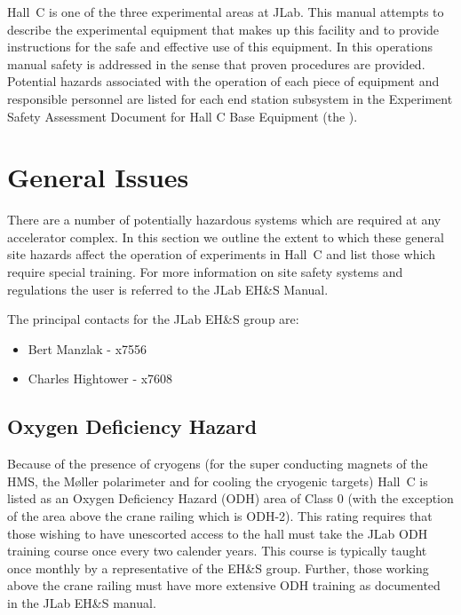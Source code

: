 %
%

Hall~C is one of the three experimental areas at JLab. This manual
attempts to describe the experimental equipment that makes up this facility
and to provide instructions for the safe and effective use of this equipment.
In this operations manual safety is addressed in the sense that proven
procedures are provided. Potential hazards associated with the operation
of each piece of equipment and responsible personnel are listed for each
end station subsystem in the Experiment Safety Assessment Document
for Hall C Base Equipment 
(the ).  

\section{General Issues}

There are a number of potentially hazardous systems which are required
at any accelerator complex.
In this section we outline the extent to which these general site hazards
affect the operation of experiments in Hall~C and list those which
require special training. For more information on site safety systems
and regulations the user is referred to the JLab EH\&S Manual.

The principal contacts for the JLab EH\&S group are:

\begin{itemize}
\item[~]Bert Manzlak  - x7556
\item[~]Charles Hightower - x7608
\end{itemize}

\subsection{Oxygen Deficiency Hazard}

Because of the presence of cryogens (for the super conducting magnets
of the HMS, the M\o ller polarimeter and for cooling the cryogenic
targets) Hall~C is listed as an Oxygen Deficiency Hazard (ODH) area of
Class 0 (with the exception of the area above the crane railing which
is ODH-2).  This rating requires that those wishing to have unescorted
access to the hall must take the JLab ODH training course once every
two calender years. This course is typically taught once monthly by a
representative of the EH\&S group.  Further, those working above the
crane railing must have more extensive ODH training as documented in
the JLab EH\&S manual.


